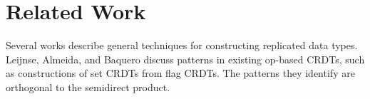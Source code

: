 \documentclass[acmsmall,nonacm]{acmart}
\newcommand{\mc}[1]{\ensuremath{\mathcal{#1}}}
\newcommand{\msf}[1]{\ensuremath{\mathsf{#1}}}
\theoremstyle{plain}
\theoremstyle{definition}
\begin{document}
%
%
%
%
%
%
%
%






\section{Related Work}
Several works describe general techniques for constructing replicated data types.  Leijnse, Almeida, and Baquero \cite{op_based_patterns} discuss patterns in existing op-based CRDTs, such as constructions of set CRDTs from flag CRDTs.  The patterns they identify are orthogonal to the semidirect product.
\end{document}
